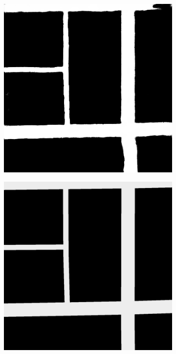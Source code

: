 \documentclass[10pt,conference,compsocconf]{IEEEtran}
\begin{document}
\begin{figure}[ht]
\begin{subfigure}{0.20\linewidth}
    \end{subfigure}
    \begin{subfigure}{0.20\linewidth}
        \centering
        \includegraphics[width=0.9\linewidth]{doc/images/perfect_unet.png}
    \end{subfigure}
    \begin{subfigure}{0.20\linewidth}
        \centering
        \includegraphics[width=0.9\linewidth]{doc/images/perfect_gt.png}
    \end{subfigure}\\
    

\end{figure}
\end{document}
